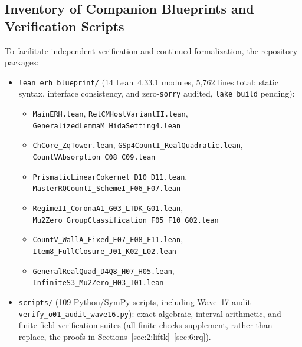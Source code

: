 \subsection{Inventory of Companion Blueprints and Verification Scripts}\label{sec:7:artifacts}

To facilitate independent verification and continued formalization, the repository packages:
\begin{itemize}
\item \texttt{lean\_erh\_blueprint/} (14 Lean~4.33.1 modules, 5,762 lines total; static syntax, interface consistency, and zero-\texttt{sorry} audited, \texttt{lake build} pending):
\begin{itemize}[leftmargin=1.2em]
  \item \texttt{MainERH.lean}, \texttt{RelCMHostVariantII.lean}, \texttt{GeneralizedLemmaM\_HidaSetting4.lean}
  \item \texttt{ChCore\_ZqTower.lean}, \texttt{GSp4CountI\_RealQuadratic.lean}, \texttt{CountVAbsorption\_C08\_C09.lean}
  \item \texttt{PrismaticLinearCokernel\_D10\_D11.lean}, \texttt{MasterRQCountI\_SchemeI\_F06\_F07.lean}
  \item \texttt{RegimeII\_CoronaA1\_G03\_LTDK\_G01.lean}, \texttt{Mu2Zero\_GroupClassification\_F05\_F10\_G02.lean}
  \item \texttt{CountV\_WallA\_Fixed\_E07\_E08\_F11.lean}, \texttt{Item8\_FullClosure\_J01\_K02\_L02.lean}
  \item \texttt{GeneralRealQuad\_D4Q8\_H07\_H05.lean}, \texttt{InfiniteS3\_Mu2Zero\_H03\_I01.lean}
\end{itemize}
\item \texttt{scripts/} (109 Python/SymPy scripts, including Wave~17 audit \texttt{verify\_o01\_audit\_wave16.py}): exact algebraic, interval-arithmetic, and finite-field verification suites (all finite checks supplement, rather than replace, the proofs in Sections~\ref{sec:2:liftk}--\ref{sec:6:rq}).
\end{itemize}

